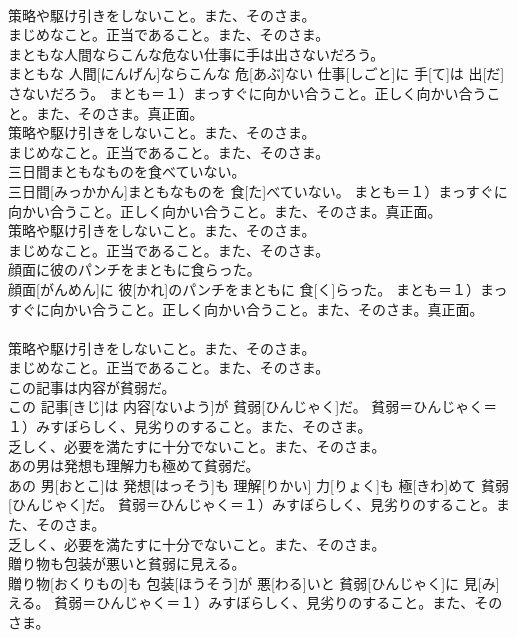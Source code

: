 \documentclass[8pt]{extreport}
\begin{document}
\begin{CJK}{UTF8}{min}
{\\	策略や駆け引きをしないこと。また、そのさま。 　　　　
\\	まじめなこと。正当であること。また、そのさま。
\\	まともな人間ならこんな危ない仕事に手は出さないだろう。	
\\	まともな 人間[にんげん]ならこんな 危[あぶ]ない 仕事[しごと]に 手[て]は 出[だ]さないだろう。	まとも＝１）まっすぐに向かい合うこと。正しく向かい合うこと。また、そのさま。真正面。 　　　　
\\	策略や駆け引きをしないこと。また、そのさま。 　　　　
\\	まじめなこと。正当であること。また、そのさま。
\\	三日間まともなものを食べていない。	
\\	三日間[みっかかん]まともなものを 食[た]べていない。	まとも＝１）まっすぐに向かい合うこと。正しく向かい合うこと。また、そのさま。真正面。 　　　　
\\	策略や駆け引きをしないこと。また、そのさま。 　　　　
\\	まじめなこと。正当であること。また、そのさま。
\\	顔面に彼のパンチをまともに食らった。	
\\	顔面[がんめん]に 彼[かれ]のパンチをまともに 食[く]らった。	まとも＝１）まっすぐに向かい合うこと。正しく向かい合うこと。また、そのさま。真正面。 　　　　
\\	策略や駆け引きをしないこと。また、そのさま。 　　　　
\\	まじめなこと。正当であること。また、そのさま。
\\	この記事は内容が貧弱だ。	
\\	この 記事[きじ]は 内容[ないよう]が 貧弱[ひんじゃく]だ。	貧弱＝ひんじゃく＝１）みすぼらしく、見劣りのすること。また、そのさま。 　　　　　　　　　
\\	乏しく、必要を満たすに十分でないこと。また、そのさま。
\\	あの男は発想も理解力も極めて貧弱だ。	
\\	あの 男[おとこ]は 発想[はっそう]も 理解[りかい] 力[りょく]も 極[きわ]めて 貧弱[ひんじゃく]だ。	貧弱＝ひんじゃく＝１）みすぼらしく、見劣りのすること。また、そのさま。 　　　　　　　　　
\\	乏しく、必要を満たすに十分でないこと。また、そのさま。
\\	贈り物も包装が悪いと貧弱に見える。	
\\	贈り物[おくりもの]も 包装[ほうそう]が 悪[わる]いと 貧弱[ひんじゃく]に 見[み]える。	貧弱＝ひんじゃく＝１）みすぼらしく、見劣りのすること。また、そのさま。 　　　　　　　　　
}
\end{CJK}
\end{document}
